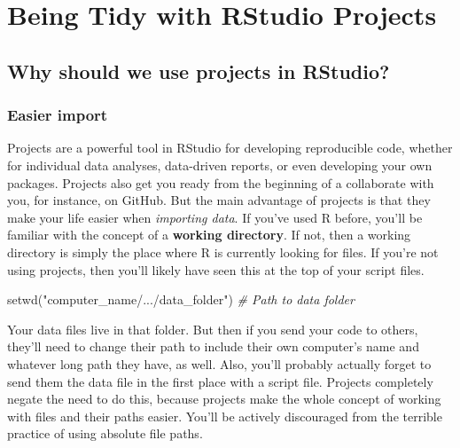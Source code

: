 \documentclass[
]{article}
\newenvironment{Shaded}{\begin{snugshade}}{\end{snugshade}}
\newcommand{\CommentTok}[1]{\textcolor[rgb]{0.56,0.35,0.01}{\textit{#1}}}
\newcommand{\FunctionTok}[1]{\textcolor[rgb]{0.00,0.00,0.00}{#1}}
\newcommand{\NormalTok}[1]{#1}
\newcommand{\StringTok}[1]{\textcolor[rgb]{0.31,0.60,0.02}{#1}}
\begin{document}
\hypertarget{being-tidy-with-rstudio-projects}{%
\section{Being Tidy with RStudio Projects}\label{being-tidy-with-rstudio-projects}}

\hypertarget{why-should-we-use-projects-in-rstudio}{%
\subsection{Why should we use projects in RStudio?}\label{why-should-we-use-projects-in-rstudio}}

\hypertarget{easier-import}{%
\subsubsection{Easier import}\label{easier-import}}

Projects are a powerful tool in RStudio for developing reproducible code, whether for individual data analyses, data-driven reports, or even developing your own packages. Projects also get you ready from the beginning of a collaborate with you, for instance, on GitHub. But the main advantage of projects is that they make your life easier when \emph{importing data}. If you've used R before, you'll be familiar with the concept of a \textbf{working directory}. If not, then a working directory is simply the place where R is currently looking for files. If you're not using projects, then you'll likely have seen this at the top of your script files.

\begin{Shaded}
\begin{Highlighting}[]
\FunctionTok{setwd}\NormalTok{(}\StringTok{"computer\_name/.../data\_folder"}\NormalTok{)  }\CommentTok{\# Path to data folder}
\end{Highlighting}
\end{Shaded}

Your data files live in that folder. But then if you send your code to others, they'll need to change their path to include their own computer's name and whatever long path they have, as well. Also, you'll probably actually forget to send them the data file in the first place with a script file. Projects completely negate the need to do this, because projects make the whole concept of working with files and their paths easier. You'll be actively discouraged from the terrible practice of using absolute file paths.
\end{document}
